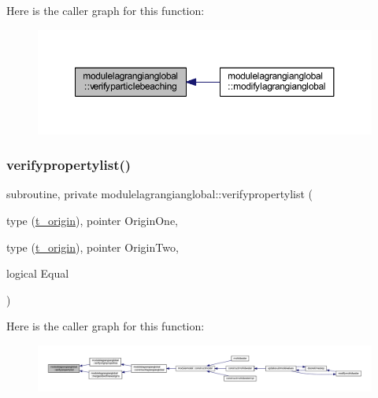 Here is the caller graph for this function\+:\nopagebreak
\begin{figure}[H]
\begin{center}
\leavevmode
\includegraphics[width=350pt]{namespacemodulelagrangianglobal_a2d56e0e16cf1181052cd535803200b87_icgraph}
\end{center}
\end{figure}
\mbox{\label{namespacemodulelagrangianglobal_a2f8a821bfd65da179345d2d6813fb1e3}} 
\subsubsection{\texorpdfstring{verifypropertylist()}{verifypropertylist()}}
{\footnotesize\ttfamily subroutine, private modulelagrangianglobal\+::verifypropertylist (\begin{DoxyParamCaption}\item[{type (\mbox{\hyperlink{structmodulelagrangianglobal_1_1t__origin}{t\+\_\+origin}}), pointer}]{Origin\+One,  }\item[{type (\mbox{\hyperlink{structmodulelagrangianglobal_1_1t__origin}{t\+\_\+origin}}), pointer}]{Origin\+Two,  }\item[{logical}]{Equal }\end{DoxyParamCaption})\hspace{0.3cm}{\ttfamily [private]}}

Here is the caller graph for this function\+:\nopagebreak
\begin{figure}[H]
\begin{center}
\leavevmode
\includegraphics[width=350pt]{namespacemodulelagrangianglobal_a2f8a821bfd65da179345d2d6813fb1e3_icgraph}
\end{center}
\end{figure}
\mbox{\label{namespacemodulelagrangianglobal_a690a5144506cf803e45f92de5eea31d7}} 
